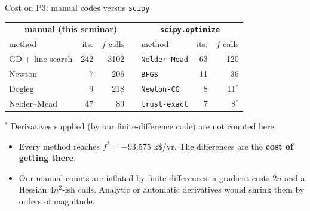 \begin{frame}{Cost on P3: manual codes versus \texttt{scipy}}
  \centering\small
  \begin{tabular}{lrrr@{\hskip 1.2cm}lrr}
    \toprule
    \multicolumn{4}{c}{\textbf{manual (this seminar)}} & \multicolumn{3}{c}{\textbf{\texttt{scipy.optimize}}}\\
    method & its. & $f$ calls & & method & its. & $f$ calls\\
    \midrule
    GD + line search & 242 & 3102 & & \texttt{Nelder-Mead} & 63 & 120\\
    Newton & 7 & 206 & & \texttt{BFGS} & 11 & 36\\
    Dogleg & 9 & 218 & & \texttt{Newton-CG} & 8 & 11$^{\ast}$\\
    Nelder--Mead & 47 & 89 & & \texttt{trust-exact} & 7 & 8$^{\ast}$\\
    \bottomrule
  \end{tabular}

  \vspace{0.3cm}
  \footnotesize $^{\ast}$ Derivatives supplied (by our finite-difference code) are not counted here.\\
  \normalsize
  \begin{itemize}
    \item Every method reaches $f^\ast=-93.575$ k\$/yr. The differences are the \textbf{cost of getting there}.
    \item Our manual counts are inflated by finite differences: a gradient costs $2n$ and a Hessian $4n^2$-ish calls. Analytic or automatic derivatives would shrink them by orders of magnitude.
  \end{itemize}
\end{frame}

